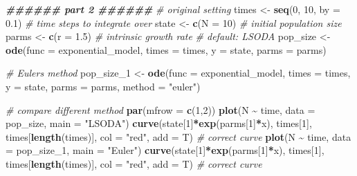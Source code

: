\documentclass[
]{book}
\newenvironment{Shaded}{\begin{snugshade}}{\end{snugshade}}
\newcommand{\AttributeTok}[1]{\textcolor[rgb]{0.13,0.29,0.53}{#1}}
\newcommand{\CommentTok}[1]{\textcolor[rgb]{0.56,0.35,0.01}{\textit{#1}}}
\newcommand{\DecValTok}[1]{\textcolor[rgb]{0.00,0.00,0.81}{#1}}
\newcommand{\DocumentationTok}[1]{\textcolor[rgb]{0.56,0.35,0.01}{\textbf{\textit{#1}}}}
\newcommand{\FloatTok}[1]{\textcolor[rgb]{0.00,0.00,0.81}{#1}}
\newcommand{\FunctionTok}[1]{\textcolor[rgb]{0.13,0.29,0.53}{\textbf{#1}}}
\newcommand{\NormalTok}[1]{#1}
\newcommand{\OtherTok}[1]{\textcolor[rgb]{0.56,0.35,0.01}{#1}}
\newcommand{\SpecialCharTok}[1]{\textcolor[rgb]{0.81,0.36,0.00}{\textbf{#1}}}
\newcommand{\StringTok}[1]{\textcolor[rgb]{0.31,0.60,0.02}{#1}}
\begin{document}
\begin{Shaded}
\begin{Highlighting}[]
\DocumentationTok{\#\#\#\#\#\# part 2 \#\#\#\#\#\#}
\CommentTok{\# original setting}
\NormalTok{times }\OtherTok{\textless{}{-}} \FunctionTok{seq}\NormalTok{(}\DecValTok{0}\NormalTok{, }\DecValTok{10}\NormalTok{, }\AttributeTok{by =} \FloatTok{0.1}\NormalTok{)  }\CommentTok{\# time steps to integrate over}
\NormalTok{state }\OtherTok{\textless{}{-}} \FunctionTok{c}\NormalTok{(}\AttributeTok{N =} \DecValTok{10}\NormalTok{)  }\CommentTok{\# initial population size}
\NormalTok{parms }\OtherTok{\textless{}{-}} \FunctionTok{c}\NormalTok{(}\AttributeTok{r =} \FloatTok{1.5}\NormalTok{)  }\CommentTok{\# intrinsic growth rate}
\CommentTok{\# default: LSODA}
\NormalTok{pop\_size }\OtherTok{\textless{}{-}} \FunctionTok{ode}\NormalTok{(}\AttributeTok{func =}\NormalTok{ exponential\_model, }\AttributeTok{times =}\NormalTok{ times, }\AttributeTok{y =}\NormalTok{ state, }\AttributeTok{parms =}\NormalTok{ parms)}

\CommentTok{\# Euler\textquotesingle{}s method}
\NormalTok{pop\_size\_1 }\OtherTok{\textless{}{-}} \FunctionTok{ode}\NormalTok{(}\AttributeTok{func =}\NormalTok{ exponential\_model, }\AttributeTok{times =}\NormalTok{ times, }\AttributeTok{y =}\NormalTok{ state, }\AttributeTok{parms =}\NormalTok{ parms, }\AttributeTok{method =} \StringTok{"euler"}\NormalTok{)}

\CommentTok{\# compare different method}
\FunctionTok{par}\NormalTok{(}\AttributeTok{mfrow =} \FunctionTok{c}\NormalTok{(}\DecValTok{1}\NormalTok{,}\DecValTok{2}\NormalTok{))}
\FunctionTok{plot}\NormalTok{(N }\SpecialCharTok{\textasciitilde{}}\NormalTok{ time, }\AttributeTok{data =}\NormalTok{ pop\_size, }\AttributeTok{main =} \StringTok{"LSODA"}\NormalTok{)}
\FunctionTok{curve}\NormalTok{(state[}\DecValTok{1}\NormalTok{]}\SpecialCharTok{*}\FunctionTok{exp}\NormalTok{(parms[}\DecValTok{1}\NormalTok{]}\SpecialCharTok{*}\NormalTok{x), times[}\DecValTok{1}\NormalTok{], times[}\FunctionTok{length}\NormalTok{(times)], }\AttributeTok{col =} \StringTok{"red"}\NormalTok{, }\AttributeTok{add =}\NormalTok{ T) }\CommentTok{\# correct curve}
\FunctionTok{plot}\NormalTok{(N }\SpecialCharTok{\textasciitilde{}}\NormalTok{ time, }\AttributeTok{data =}\NormalTok{ pop\_size\_1, }\AttributeTok{main =} \StringTok{"Euler"}\NormalTok{)}
\FunctionTok{curve}\NormalTok{(state[}\DecValTok{1}\NormalTok{]}\SpecialCharTok{*}\FunctionTok{exp}\NormalTok{(parms[}\DecValTok{1}\NormalTok{]}\SpecialCharTok{*}\NormalTok{x), times[}\DecValTok{1}\NormalTok{], times[}\FunctionTok{length}\NormalTok{(times)], }\AttributeTok{col =} \StringTok{"red"}\NormalTok{, }\AttributeTok{add =}\NormalTok{ T) }\CommentTok{\# correct curve}
\end{Highlighting}
\end{Shaded}
\end{document}
